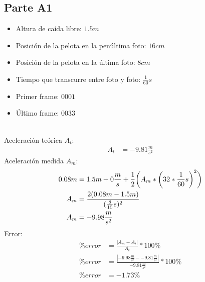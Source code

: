 \subsection{Parte A1}%
\label{sub:proce_parte_a1}

\begin{itemize}
	\item Altura de caída libre: $1.5m$
	\item Posición de la pelota en la penúltima foto: $16cm$
	\item Posición de la pelota en la última foto: $8cm$
	\item Tiempo que transcurre entre foto y foto: $ \frac{1}{60} s$
\end{itemize}
\hfill
\begin{itemize}
	\item Primer frame: $0001$
	\item Último frame: $0033$
\end{itemize}
\hfill\\
Aceleración teórica $A_t$:
\begin{align*}
	A_t &= -9.81 \frac{m}{s^2}
\end{align*}
Aceleración medida $A_m$:
\begin{align*}
	0.08m &= 1.5m + 0 \frac{m}{s} + \frac{1}{2}\bigg{(}A_m * \bigg{(}32* \frac{1}{60} s\bigg{)}^2\bigg{)} \\
	A_m &= \frac{2(0.08m - 1.5m)}{( \frac{8}{15}s)^2} \\
	A_m &= -9.98 \frac{m}{s^2}
\end{align*}
Error:
\begin{align*}
	\% error &= \frac{|A_m - A_t|}{A_t} * 100 \% \\
	\% error &= \frac{|-9.98 \frac{m}{s^2}--9.81 \frac{m}{s^2}|}{-9.81 \frac{m}{s^2}} * 100 \% \\
	\% error &= -1.73\%
\end{align*}
